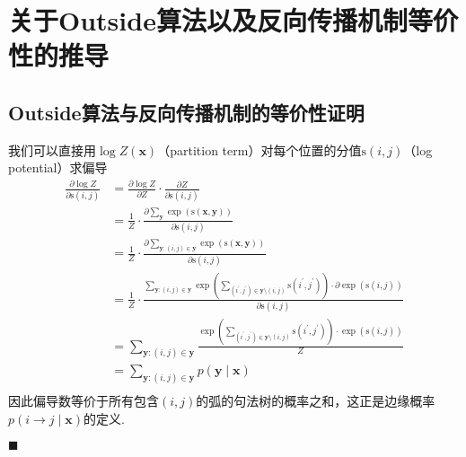 \chapter{关于Outside算法以及反向传播机制等价性的推导}

\section{Outside算法与反向传播机制的等价性证明}\label{sec:outside-backprop}
我们可以直接用$\log Z(\boldsymbol{x})$（partition term）对每个位置的分值$\mathrm{s}(i, j)$（log potential）求偏导
\begin{equation}
    \label{eq:partial-derivative}
    \begin{split}
        \frac{\partial \log Z}{\partial \mathrm{s}(i, j)} & = \frac{\partial \log Z}{\partial Z} \cdot \frac{\partial Z}{\partial \mathrm{s}(i, j)}\\
        & =\frac{1}{Z} \cdot \frac{\partial \sum_{\boldsymbol{y}} \exp \left(\mathrm{s}(\boldsymbol{x}, \boldsymbol{y}) \right)}{\partial \mathrm{s}(i, j)}\\
        & =\frac{1}{Z} \cdot \frac{\partial \sum_{\boldsymbol{y}:(i,j) \in \boldsymbol{{y}}} \exp \left(\mathrm{s}(\boldsymbol{x}, \boldsymbol{y}) \right)}{\partial \mathrm{s}(i, j)}\\
        & =\frac{1}{Z} \cdot \frac{\sum_{\boldsymbol{y}:(i,j) \in \boldsymbol{{y}}} \exp \left( \sum_{(i^{\prime}, j^{\prime}) \in \boldsymbol{y}\setminus (i,j)} \mathrm{s}(i^{\prime}, j^{\prime}) \right)\cdot \partial \exp(\mathrm{s}(i, j))}{\partial \mathrm{s}(i, j)}\\
        & =\sum_{\boldsymbol{y}:(i,j) \in \boldsymbol{{y}}} \frac{\exp \left( \sum_{(i^{\prime}, j^{\prime}) \in \boldsymbol{y}\setminus (i,j)} \mathrm{s}(i^{\prime}, j^{\prime})\right)\cdot \exp(\mathrm{s}(i,j))}{Z}\\
        &= \sum_{\boldsymbol{y}:(i,j) \in \boldsymbol{{y}}} p(\boldsymbol{y}\mid\boldsymbol{x})\\
    \end{split}
\end{equation}
因此偏导数等价于所有包含$(i,j)$的弧的句法树的概率之和，这正是边缘概率$p(i \rightarrow j\mid\boldsymbol{x})$的定义.

\noindent$\blacksquare$


